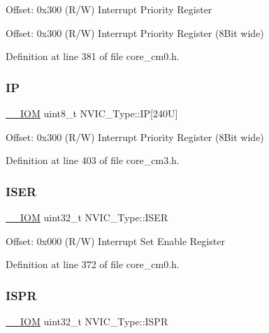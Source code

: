 Offset\+: 0x300 (R/W) Interrupt Priority Register

Offset\+: 0x300 (R/W) Interrupt Priority Register (8\+Bit wide) 

Definition at line 381 of file core\+\_\+cm0.\+h.

\mbox{\label{struct_n_v_i_c___type_a9a4341692e45d089a113986a3d344e98}} 
\subsubsection{\texorpdfstring{IP}{IP}\hspace{0.1cm}{\footnotesize\ttfamily [2/2]}}
{\footnotesize\ttfamily \hyperlink{core__sc300_8h_ab6caba5853a60a17e8e04499b52bf691}{\+\_\+\+\_\+\+I\+OM} uint8\+\_\+t N\+V\+I\+C\+\_\+\+Type\+::\+IP\mbox{[}240\+U\mbox{]}}

Offset\+: 0x300 (R/W) Interrupt Priority Register (8\+Bit wide) 

Definition at line 403 of file core\+\_\+cm3.\+h.

\mbox{\label{struct_n_v_i_c___type_ab1d578f3fd82d9d7ba937488721c57a3}} 
\subsubsection{\texorpdfstring{I\+S\+ER}{ISER}}
{\footnotesize\ttfamily \hyperlink{core__sc300_8h_ab6caba5853a60a17e8e04499b52bf691}{\+\_\+\+\_\+\+I\+OM} uint32\+\_\+t N\+V\+I\+C\+\_\+\+Type\+::\+I\+S\+ER}

Offset\+: 0x000 (R/W) Interrupt Set Enable Register 

Definition at line 372 of file core\+\_\+cm0.\+h.

\mbox{\label{struct_n_v_i_c___type_a78a829d7fa59290031fedbc95af35825}} 
\subsubsection{\texorpdfstring{I\+S\+PR}{ISPR}}
{\footnotesize\ttfamily \hyperlink{core__sc300_8h_ab6caba5853a60a17e8e04499b52bf691}{\+\_\+\+\_\+\+I\+OM} uint32\+\_\+t N\+V\+I\+C\+\_\+\+Type\+::\+I\+S\+PR}


